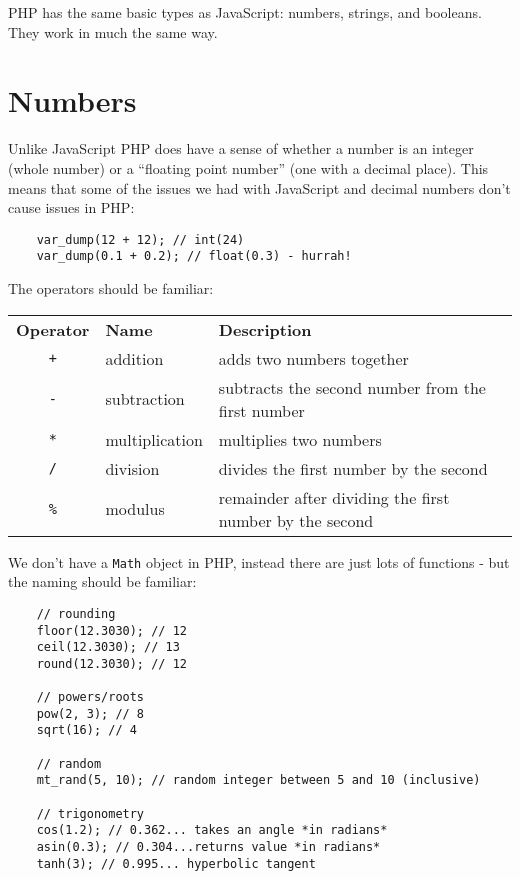 PHP has the same basic types as JavaScript: numbers, strings, and booleans. They work in much the same way.


\section{Numbers}

Unlike JavaScript PHP does have a sense of whether a number is an integer (whole number) or a ``floating point number'' (one with a decimal place). This means that some of the issues we had with JavaScript and decimal numbers don't cause issues in PHP:

\begin{verbatim}
    var_dump(12 + 12); // int(24)
    var_dump(0.1 + 0.2); // float(0.3) - hurrah!
\end{verbatim}


The operators should be familiar:
\\

\begin{small}
    \begin{tabularx}{\textwidth}{c l X}
        \textbf{Operator} & \textbf{Name} & \textbf{Description} \\
        \texttt{+}  & addition        & adds two numbers together \\
        \texttt{-}  & subtraction     & subtracts the second number from the first number \\
        \texttt{*}  & multiplication  & multiplies two numbers \\
        \texttt{/}  & division        & divides the first number by the second \\
        \texttt{\%} & modulus         & remainder after dividing the first number by the second
    \end{tabularx}
\end{small}

\par\bigskip


We don't have a \texttt{Math} object in PHP, instead there are just lots of functions - but the naming should be familiar:

\begin{verbatim}
    // rounding
    floor(12.3030); // 12
    ceil(12.3030); // 13
    round(12.3030); // 12

    // powers/roots
    pow(2, 3); // 8
    sqrt(16); // 4

    // random
    mt_rand(5, 10); // random integer between 5 and 10 (inclusive)

    // trigonometry
    cos(1.2); // 0.362... takes an angle *in radians*
    asin(0.3); // 0.304...returns value *in radians*
    tanh(3); // 0.995... hyperbolic tangent
\end{verbatim}


